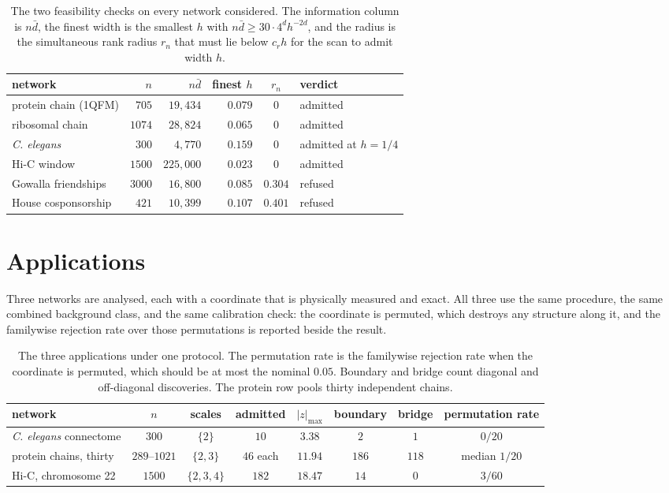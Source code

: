\documentclass[11pt]{article}
\theoremstyle{definition}
\newcommand{\1}{\mathbf 1}\newcommand{\op}{\operatorname}
\begin{document}
\begin{table}[t]\centering
\caption{The two feasibility checks on every network considered.  The
information column is $n\bar d$, the finest width is the smallest $h$ with
$n\bar d\ge30\cdot4^dh^{-2d}$, and the radius is the simultaneous rank radius
$r_n$ that must lie below $c_rh$ for the scan to admit width $h$.}
\label{tab:feas}
\begin{tabular}{lrrrcl}
\hline
network & $n$ & $n\bar d$ & finest $h$ & $r_n$ & verdict\\
\hline
protein chain (1QFM)     & $705$  & $19{,}434$ & $0.079$ & $0$     & admitted\\
ribosomal chain          & $1074$ & $28{,}824$ & $0.065$ & $0$     & admitted\\
\emph{C. elegans}        & $300$  & $4{,}770$  & $0.159$ & $0$     & admitted at $h=1/4$\\
Hi-C window              & $1500$ & $225{,}000$ & $0.023$ & $0$    & admitted\\
Gowalla friendships      & $3000$ & $16{,}800$ & $0.085$ & $0.304$ & refused\\
House cosponsorship      & $421$  & $10{,}399$ & $0.107$ & $0.401$ & refused\\
\hline
\end{tabular}
\end{table}



\section{Applications}                                       \label{sec:apps}

Three networks are analysed, each with a coordinate that is physically
measured and exact.  All three use the same procedure, the same combined
background class, and the same calibration check: the coordinate is permuted,
which destroys any structure along it, and the familywise rejection rate over
those permutations is reported beside the result.

\begin{table}[t]\centering
\caption{The three applications under one protocol.  The permutation rate is
the familywise rejection rate when the coordinate is permuted, which should be
at most the nominal $0.05$.  Boundary and bridge count diagonal and
off-diagonal discoveries.  The protein row pools thirty independent chains.}
\label{tab:apps}
\begin{tabular}{lccccccc}
\hline
network & $n$ & scales & admitted & $|z|_{\max}$ & boundary & bridge & permutation rate\\
\hline
\emph{C. elegans} connectome & $300$  & $\{2\}$     & $10$  & $3.38$  & $2$  & $1$  & $0/20$\\
protein chains, thirty       & $289$--$1021$ & $\{2,3\}$ & $46$ each & $11.94$ & $186$ & $118$ & median $1/20$\\
Hi-C, chromosome 22          & $1500$ & $\{2,3,4\}$ & $182$ & $18.47$ & $14$ & $0$  & $3/60$\\
\hline
\end{tabular}
\end{table}
\end{document}

